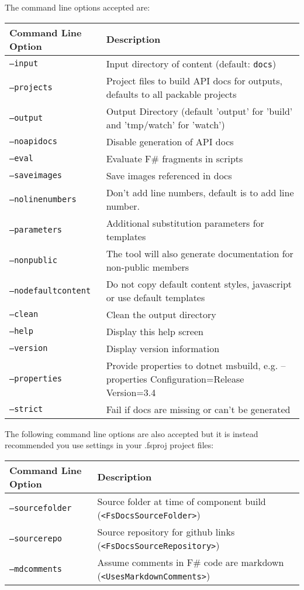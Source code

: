 \documentclass{article}
\begin{document}
The command line options accepted are:
\begin{tabular}{|l|l|}\hline
\textbf{Command Line Option} & \textbf{Description}\\ \hline\hline
\texttt{--input} & Input directory of content (default: \texttt{docs})\\ \hline
\texttt{--projects} & Project files to build API docs for outputs, defaults to all packable projects\\ \hline
\texttt{--output} & Output Directory (default 'output' for 'build' and 'tmp/watch' for 'watch')\\ \hline
\texttt{--noapidocs} & Disable generation of API docs\\ \hline
\texttt{--eval} & Evaluate F\# fragments in scripts\\ \hline
\texttt{--saveimages} & Save images referenced in docs\\ \hline
\texttt{--nolinenumbers} & Don't add line numbers, default is to add line number.\\ \hline
\texttt{--parameters} & Additional substitution parameters for templates\\ \hline
\texttt{--nonpublic} & The tool will also generate documentation for non-public members\\ \hline
\texttt{--nodefaultcontent} & Do not copy default content styles, javascript or use default templates\\ \hline
\texttt{--clean} & Clean the output directory\\ \hline
\texttt{--help} & Display this help screen\\ \hline
\texttt{--version} & Display version information\\ \hline
\texttt{--properties} & Provide properties to dotnet msbuild, e.g. --properties Configuration=Release Version=3.4\\ \hline
\texttt{--strict} & Fail if docs are missing or can't be generated\\ \hline
\end{tabular}



The following command line options are also accepted but it is instead recommended you use
settings in your .fsproj project files:
\begin{tabular}{|l|l|}\hline
\textbf{Command Line Option} & \textbf{Description}\\ \hline\hline
\texttt{--sourcefolder} & Source folder at time of component build (\texttt{<FsDocsSourceFolder>})\\ \hline
\texttt{--sourcerepo} & Source repository for github links (\texttt{<FsDocsSourceRepository>})\\ \hline
\texttt{--mdcomments} & Assume comments in F\# code are markdown (\texttt{<UsesMarkdownComments>})\\ \hline
\end{tabular}
\end{document}
